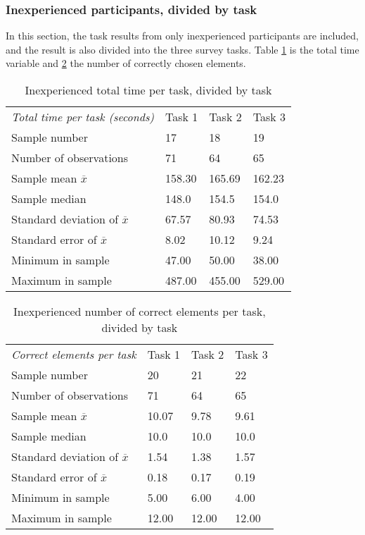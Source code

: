 \subsubsection{Inexperienced participants, divided by task}\label{sec:taskdivided_inexperienced}
In this section, the task results from only inexperienced participants are included, and the result is also divided into the three survey tasks. 
Table \ref{tab:totaltime_tasks_inexperienced} is the total time variable and \ref{tab:totalcorrect_tasks_inexperienced} the number of correctly chosen elements. 

\begin{table}[H]
	\centering
	\begin{tabular}{l|l|l|l}
		\textit{Total time per task (seconds)} & Task 1 & Task 2 & Task 3 \\ 
		Sample number & 17 & 18 & 19 \\ \hline
		Number of observations & 71    & 64  & 65   \\
		Sample mean $\overline{x}$  & 158.30  &  165.69  &  162.23  \\
		Sample median & 148.0  &  154.5  &  154.0  \\
		Standard deviation of $\overline{x}$  & 67.57 & 80.93 & 74.53  \\
		Standard error of $\overline{x}$  & 8.02  & 10.12 & 9.24  \\
		Minimum in sample & 47.00 & 50.00 &  38.00 \\
		Maximum in sample & 487.00 & 455.00  & 529.00  \\ \hline
	\end{tabular}
	\caption[Total time, inexperienced per task]{Inexperienced total time per task, divided by task}
	\label{tab:totaltime_tasks_inexperienced}
\end{table}

\begin{table}[H]
	\centering
	\begin{tabular}{l|l|l|l}
		\textit{Correct elements per task} & Task 1 & Task 2 & Task 3 \\ 
		Sample number & 20 & 21 & 22 \\ \hline
		Number of observations & 71 & 64  & 65 \\
		Sample mean $\overline{x}$  & 10.07  &  9.78 &  9.61  \\
		Sample median  & 10.0  & 10.0  &  10.0  \\
		Standard deviation of $\overline{x}$  & 1.54  & 1.38  & 1.57   \\
		Standard error of $\overline{x}$  & 0.18 & 0.17 & 0.19  \\
		Minimum in sample  & 5.00 & 6.00 &  4.00  \\
		Maximum in sample  & 12.00 & 12.00  & 12.00 \\ \hline
	\end{tabular}
	\caption[Correct elements, inexperienced per task]{Inexperienced number of correct elements per task, divided by task}
	\label{tab:totalcorrect_tasks_inexperienced}
\end{table}
\vspace{0.5cm}

